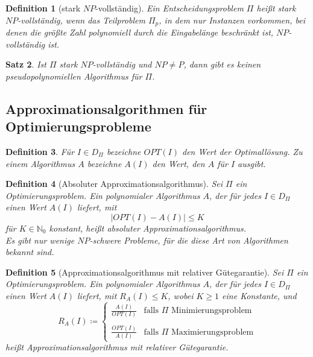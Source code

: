 \documentclass[11pt]{article}
\theoremstyle{break}
\newtheorem{satz}{Satz}[section]
\newtheorem{defi}[satz]{Definition}
\begin{document}
\begin{defi}[stark $NP$-vollständig]
Ein Entscheidungsproblem $\Pi$ heißt stark $NP$-vollständig, wenn das Teilproblem $\Pi_p$, in dem nur Instanzen vorkommen, bei denen die größte Zahl polynomiell durch die Eingabelänge beschränkt ist, $NP$-vollständig ist.
\end{defi}

\begin{satz}
Ist $\Pi$ stark $NP$-vollständig und $NP\neq P$, dann gibt es keinen pseudopolynomiellen Algorithmus für $\Pi$.
\end{satz}


\subsection{Approximationsalgorithmen für Optimierungsprobleme}

\begin{defi}
Für $I\in D_\Pi$ bezeichne $OPT(I)$ den Wert der Optimallösung. Zu einem Algorithmus $A$ bezeichne $A(I)$ den Wert, den $A$ für $I$ ausgibt.
\end{defi}

\begin{defi}[Absoluter Approximationsalgorithmus]
Sei $\Pi$ ein Optimierungsproblem. Ein polynomialer Algorithmus $A$, der für jedes $I\in D_\Pi$ einen Wert $A(I)$ liefert, mit
\[|OPT(I)-A(I)|\leq K\]
für $K\in\mathbb{N}_0$ konstant, heißt absoluter Approximationsalgorithmus.\\
Es gibt nur wenige $NP$-schwere Probleme, für die diese Art von Algorithmen bekannt sind.
\end{defi}

\begin{defi}[Approximationsalgorithmus mit relativer Gütegarantie]
Sei $\Pi$ ein Optimierungsproblem. Ein polynomialer Algorithmus $A$, der für jedes $I\in D_\Pi$ einen Wert $A(I)$ liefert, mit $R_A(I)\leq K$, wobei $K\geq 1$ eine Konstante, und
\[R_A(I)\coloneqq	
	\begin{cases}
		\frac{A(I)}{OPT(I)} & \text{falls $\Pi$ Minimierungsproblem}\\
		& \\
		\frac{OPT(I)}{A(I)} & \text{falls $\Pi$ Maximierungsproblem}
	\end{cases}
\]
heißt Approximationsalgorithmus mit relativer Gütegarantie.
\end{defi}
\end{document}
